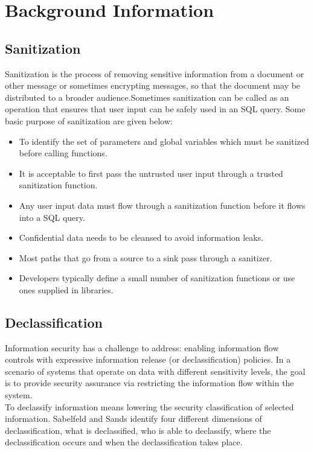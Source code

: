 \chapter{Background Information}
\section{Sanitization}
Sanitization is the process of removing sensitive information from a document or other message or sometimes encrypting messages, so that the document may be distributed to a broader audience.Sometimes sanitization can be called as an operation that ensures that user input can be safely used in an SQL query. Some basic purpose of sanitization are given below:
\begin{itemize}
	\item To identify the set of parameters and global variables which must be sanitized before calling functions.
	\item It is acceptable to first pass the untrusted user input through a trusted sanitization function.	
	\item Any user input data must flow through a sanitization function before it flows into a SQL query.
	\item Confidential data needs to be cleansed to avoid information leaks.
	\item Most paths that go from a source to a sink pass through a sanitizer.
	\item Developers typically define a small number of sanitization functions or use ones supplied in libraries.
\end{itemize}

\section{Declassification}
Information security has a challenge to address: enabling information flow controls with expressive information release (or declassification) policies. In a scenario of systems that operate on data with different sensitivity levels, the goal is to provide security assurance via restricting the information flow within the system.\\
To declassify information means lowering the security classification of selected information. Sabelfeld and Sands \cite{ref_1_sabelfeld2009declassification} identify four different dimensions of declassification, what is declassified, who is able to declassify, where the declassification occurs and when the declassification takes place.

